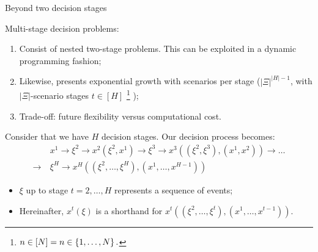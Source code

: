 \begin{frame}{Beyond two decision stages} 

	\alert{Multi-stage} decision problems:
	\vspace{-6pt}
	\begin{enumerate}
		\item Consist of \alert{nested two-stage problems}. This can be exploited in a \alert{dynamic programming} fashion;
		\item Likewise, presents \alert{exponential growth} with scenarios per stage ($|\Xi|^{|H|-1}$, with $|\Xi|$-scenario stages $t \in [H]$%
		\footnote{$n \in [N] = n \in \left\{ 1,\dots,N \right \}.$}
		);
		\item Trade-off: future \alert{flexibility} versus computational cost.	
	\end{enumerate}
	
	\pause
	Consider that we have $H$ decision stages. Our decision process becomes:
	\begin{align*}
		& x^1 \rightarrow \xi^2 \rightarrow x^2(\xi^2,x^1)
	 	 \rightarrow \xi^3
	 	 \rightarrow x^3((\xi^2,\xi^3), (x^1,x^2)) \rightarrow \dots \\\rightarrow 	
	 	 ~& \xi^H \rightarrow x^H((\xi^2,\dots,\xi^H), (x^1,\dots,x^{H-1}))
	\end{align*}
	
	\vspace{-6pt}	
	\begin{itemize}
		\item $\xi$ up to stage $t= 2, \dots, H$ represents a \alert{sequence} of events;
		\item Hereinafter, $x^t(\xi)$ is a shorthand for $x^t((\xi^2,\dots,\xi^t), (x^1,\dots,x^{t-1}))$. \vspace{6pt}	
	\end{itemize}
	 
\end{frame}



